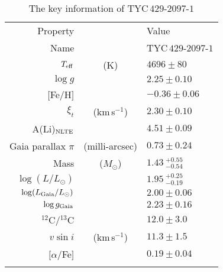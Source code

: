 \documentclass[twoside,onecolumnm,12pt]{article}
\newcommand{\Teff}{$T_{\rm eff}$}
\newcommand{\logg}{$\log g$}
\newcommand{\logggaia}{$\log g_{\rm Gaia}$}
\newcommand{\Vt}  {$\xi_t$}
\newcommand{\kms}{km\,s$^{-1}$}
\newcommand{\starname}{TYC\,$429$-$2097$-$1$}
\newcommand{\ciso}{$^{12}$C/$^{13}$C}
\begin{document}
 \begin{table}[!t]
 \begin{center}
 \caption{The key information of \starname}\label{tab1}
 \begin{tabular}{rcl}
 \hline\hline\noalign{\smallskip}
   Property & & Value\\
 \noalign{\smallskip}
 \hline\noalign{\smallskip}
   Name                             &                & \starname       \\
   \Teff                            & (K)            & $4696\pm80$     \\
   \logg                            &                & $2.25\pm0.10$   \\
   $[$Fe/H$]$                       &                & $-0.36\pm0.06$  \\
   \Vt                              & (\kms)         & $2.30\pm0.10$   \\
   A(Li)$_{\rm NLTE}$               &                & $4.51\pm0.09$   \\
   \noalign{\smallskip}\hline\noalign{\smallskip}
   Gaia parallax $\pi$              & (milli-arcsec) & $0.73\pm0.24$   \\
   Mass                             & ($M_\odot$)    & $1.43\ ^{+0.55}_{-0.54}$ \\
   \noalign{\smallskip}
   $\log (L/L_{\odot})$             &                & $1.95\ ^{+0.25}_{-0.19}$ \\
   $\log (L_{\rm{Gaia}}/L_{\odot})$ &                & $2.00\pm0.06$   \\
   \logggaia                        &                & $2.23\pm0.16$   \\
   \noalign{\smallskip}\hline\noalign{\smallskip}
   \ciso                            &                & $12.0\pm3.0$    \\
   $v\sin i$                        & (\kms)         & $11.3\pm1.5$    \\
   $[\alpha$/Fe$]$                  &                & $0.19\pm0.04$   \\
 \noalign{\smallskip} \hline
 \end{tabular}
 \end{center}
 \end{table}
 


\end{document}
